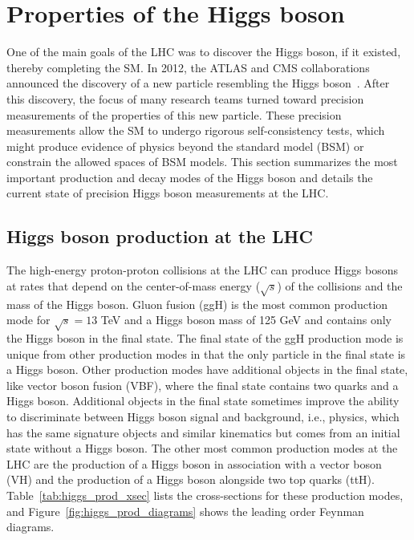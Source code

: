 \section{Properties of the Higgs boson}

One of the main goals of the LHC was to discover the Higgs boson, if it existed, thereby completing the SM. In 2012, the ATLAS and CMS collaborations announced the discovery of a new particle resembling the Higgs boson~\cite{atlas:2012_higgs,cms:2012_higgs}. After this discovery, the focus of many research teams turned toward precision measurements of the properties of this new particle. These precision measurements allow the SM to undergo rigorous self-consistency tests, which might produce evidence of physics beyond the standard model (BSM) or constrain the allowed spaces of BSM models. This section summarizes the most important production and decay modes of the Higgs boson and details the current state of precision Higgs boson measurements at the LHC.

\subsection{Higgs boson production at the LHC}

The high-energy proton-proton collisions at the LHC can produce Higgs bosons at rates that depend on the center-of-mass energy ($\sqrt{s}$) of the collisions and the mass of the Higgs boson. Gluon fusion (ggH) is the most common production mode for $\sqrt{s} = 13$ TeV and a Higgs boson mass of 125 GeV and contains only the Higgs boson in the final state. The final state of the ggH production mode is unique from other production modes in that the only particle in the final state is a Higgs boson. Other production modes have additional objects in the final state, like vector boson fusion (VBF), where the final state contains two quarks and a Higgs boson. Additional objects in the final state sometimes improve the ability to discriminate between Higgs boson signal and background, i.e., physics, which has the same signature objects and similar kinematics but comes from an initial state without a Higgs boson. The other most common production modes at the LHC are the production of a Higgs boson in association with a vector boson (VH) and the production of a Higgs boson alongside two top quarks (ttH). Table~\ref{tab:higgs_prod_xsec} lists the cross-sections for these production modes, and Figure~\ref{fig:higgs_prod_diagrams} shows the leading order Feynman diagrams. 

